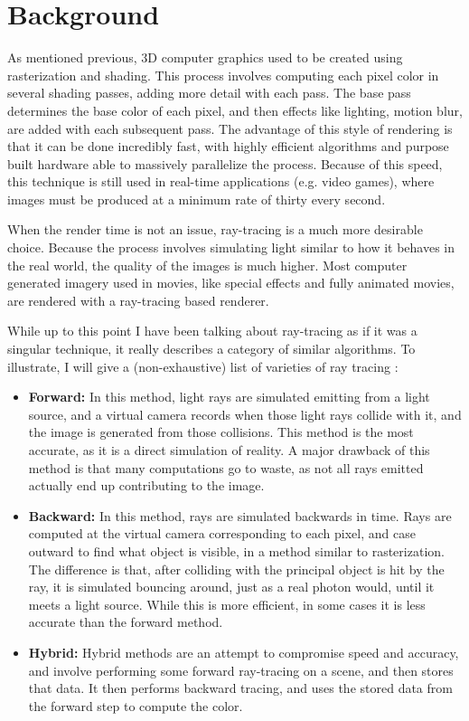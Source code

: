\documentclass{IEEEtran}
\begin{document}
\section*{Background}

As mentioned previous, 3D computer graphics used to be created using rasterization and shading. This
process involves computing each pixel color in several shading passes, adding more detail with each
pass. The base pass determines the base color of each pixel, and then effects like lighting, motion
blur, are added with each subsequent pass. The advantage of this style of rendering is that it can
be done incredibly fast, with highly efficient algorithms and purpose built hardware able to
massively parallelize the process. Because of this speed, this technique is still used in real-time
applications (e.g. video games), where images must be produced at a minimum rate of thirty every
second.

When the render time is not an issue, ray-tracing is a much more desirable choice. Because the
process involves simulating light similar to how it behaves in the real world, the quality of the
images is much higher. Most computer generated imagery used in movies, like special effects and
fully animated movies, are rendered with a ray-tracing based renderer.

While up to this point I have been talking about ray-tracing as if it was a singular technique, it
really describes a category of similar algorithms. To illustrate, I will give a (non-exhaustive)
list of varieties of ray tracing \cite{stanfordRayTracingTypes}:
\begin{itemize}
    \item \textbf{Forward:} In this method, light rays are simulated emitting from a light source,
    and a virtual camera records when those light rays collide with it, and the image is generated
    from those collisions. This method is the most accurate, as it is a direct simulation of
    reality. A major drawback of this method is that many computations go to waste, as not all rays
    emitted actually end up contributing to the image.
    \item \textbf{Backward:} In this method, rays are simulated backwards in time. Rays are computed
    at the virtual camera corresponding to each pixel, and case outward to find what object is
    visible, in a method similar to rasterization. The difference is that, after colliding with the
    principal object is hit by the ray, it is simulated bouncing around, just as a real photon
    would, until it meets a light source. While this is more efficient, in some cases it is less
    accurate than the forward method.
    \item \textbf{Hybrid:} Hybrid methods are an attempt to compromise speed and accuracy, and
    involve performing some forward ray-tracing on a scene, and then stores that data. It then
    performs backward tracing, and uses the stored data from the forward step to compute the color.
\end{itemize}
\end{document}
